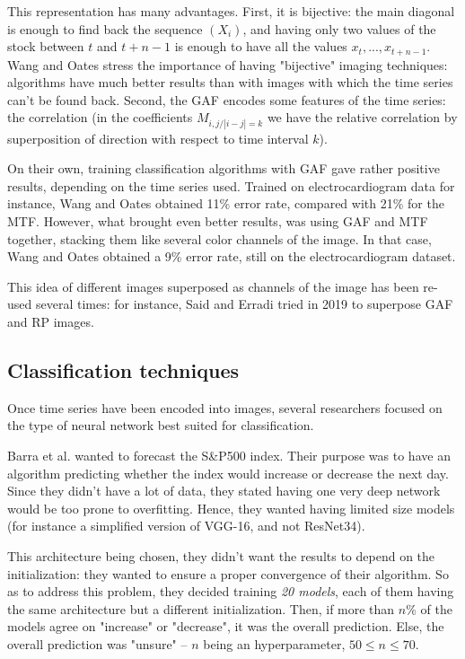 \documentclass[11pt]{article}
\begin{document}
\begin{onehalfspace}
This representation has many advantages. First, it is bijective: the main diagonal is enough to find back the sequence $(X_i)$, and having only two values of the stock between $t$ and $t+n-1$ is enough to have all the values $x_t, ..., x_{t+n-1}$. Wang and Oates stress the importance of having "bijective" imaging techniques: algorithms have much better results than with images with which the time series can't be found back. Second, the GAF encodes some features of the time series: the correlation (in the coefficients $M_{i,j / |i-j| = k}$ we have the relative correlation by superposition of direction with respect to time interval $k$).

On their own, training classification algorithms with GAF gave rather positive results, depending on the time series used. Trained on electrocardiogram data for instance, Wang and Oates \cite{wang_encod} obtained 11\% error rate, compared with 21\% for the MTF. However, what brought even better results, was using GAF and MTF together, stacking them like several color channels of the image. In that case, Wang and Oates \cite{wang} obtained a 9\% error rate, still on the electrocardiogram dataset.

This idea of different images superposed as channels of the image has been re-used several times: for instance, Said and Erradi tried in 2019 \cite{said} to superpose GAF and RP images.

\subsection{Classification techniques}
\label{sec:LR_classif}

Once time series have been encoded into images, several researchers focused on the type of neural network best suited for classification.

Barra et al. \cite{barra} wanted to forecast the S\&P500 index. Their purpose was to have an algorithm predicting whether the index would increase or decrease the next day. Since they didn't have a lot of data, they stated having one very deep network would be too prone to overfitting. Hence, they wanted having limited size models (for instance a simplified version of VGG-16, and not ResNet34). 

This architecture being chosen, they didn't want the results to depend on the initialization: they wanted to ensure a proper convergence of their algorithm. So as to address this problem, they decided training \emph{20 models}, each of them having the same architecture but a different initialization. Then, if more than $n$\% of the models agree on "increase" or "decrease", it was the overall prediction. Else, the overall prediction was "unsure" -- $n$ being an hyperparameter, $50 \leq n \leq 70$. 


\end{onehalfspace}
\end{document}
